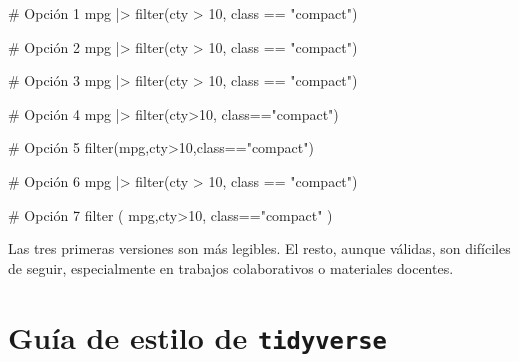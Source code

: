 \documentclass[
  spanish,
  a4paper,
]{scrbook}
\newenvironment{Shaded}{\begin{snugshade}}{\end{snugshade}}
\newcommand{\CommentTok}[1]{\textcolor[rgb]{0.37,0.37,0.37}{#1}}
\newcommand{\DecValTok}[1]{\textcolor[rgb]{0.68,0.00,0.00}{#1}}
\newcommand{\FunctionTok}[1]{\textcolor[rgb]{0.28,0.35,0.67}{#1}}
\newcommand{\NormalTok}[1]{\textcolor[rgb]{0.00,0.23,0.31}{#1}}
\newcommand{\SpecialCharTok}[1]{\textcolor[rgb]{0.37,0.37,0.37}{#1}}
\newcommand{\StringTok}[1]{\textcolor[rgb]{0.13,0.47,0.30}{#1}}
\begin{document}
\begin{Shaded}
\begin{Highlighting}[]
\CommentTok{\# Opción 1}
\NormalTok{mpg }\SpecialCharTok{|\textgreater{}} 
  \FunctionTok{filter}\NormalTok{(cty }\SpecialCharTok{\textgreater{}} \DecValTok{10}\NormalTok{, class }\SpecialCharTok{==} \StringTok{"compact"}\NormalTok{)}

\CommentTok{\# Opción 2}
\NormalTok{mpg }\SpecialCharTok{|\textgreater{}} \FunctionTok{filter}\NormalTok{(cty }\SpecialCharTok{\textgreater{}} \DecValTok{10}\NormalTok{, class }\SpecialCharTok{==} \StringTok{"compact"}\NormalTok{)}

\CommentTok{\# Opción 3}
\NormalTok{mpg }\SpecialCharTok{|\textgreater{}} 
  \FunctionTok{filter}\NormalTok{(cty }\SpecialCharTok{\textgreater{}} \DecValTok{10}\NormalTok{, }
\NormalTok{         class }\SpecialCharTok{==} \StringTok{"compact"}\NormalTok{)}

\CommentTok{\# Opción 4}
\NormalTok{mpg }\SpecialCharTok{|\textgreater{}} \FunctionTok{filter}\NormalTok{(cty}\SpecialCharTok{\textgreater{}}\DecValTok{10}\NormalTok{, class}\SpecialCharTok{==}\StringTok{"compact"}\NormalTok{)}

\CommentTok{\# Opción 5}
\FunctionTok{filter}\NormalTok{(mpg,cty}\SpecialCharTok{\textgreater{}}\DecValTok{10}\NormalTok{,class}\SpecialCharTok{==}\StringTok{"compact"}\NormalTok{)}

\CommentTok{\# Opción 6}
\NormalTok{mpg }\SpecialCharTok{|\textgreater{}} 
\FunctionTok{filter}\NormalTok{(cty }\SpecialCharTok{\textgreater{}} \DecValTok{10}\NormalTok{, }
\NormalTok{                        class }\SpecialCharTok{==} \StringTok{"compact"}\NormalTok{)}

\CommentTok{\# Opción 7}
\FunctionTok{filter}\NormalTok{ ( mpg,cty}\SpecialCharTok{\textgreater{}}\DecValTok{10}\NormalTok{,     class}\SpecialCharTok{==}\StringTok{"compact"}\NormalTok{ )}
\end{Highlighting}
\end{Shaded}

Las tres primeras versiones son más legibles. El resto, aunque válidas,
son difíciles de seguir, especialmente en trabajos colaborativos o
materiales docentes.

\section{\texorpdfstring{Guía de estilo de
\textbf{\texttt{tidyverse}}}{Guía de estilo de tidyverse}}\label{guuxeda-de-estilo-de-tidyverse}
\end{document}
